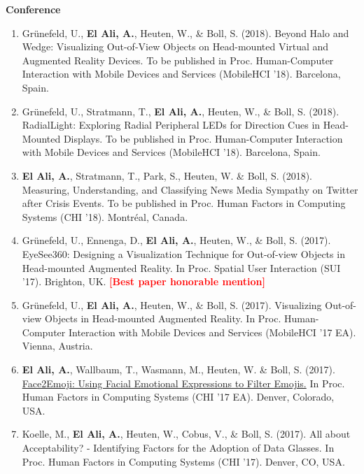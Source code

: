 \documentclass{article}
\begin{document}
\textbf{Conference}

\begin{enumerate}

\item Gr{\"u}nefeld, U., \textbf{El Ali, A.}, Heuten, W., \& Boll, S. (2018). Beyond Halo and Wedge: Visualizing Out-of-View Objects on Head-mounted Virtual and Augmented Reality Devices. To be published in Proc. Human-Computer Interaction with Mobile Devices and Services (MobileHCI '18). Barcelona, Spain. 

\item Gr{\"u}nefeld, U., Stratmann, T., \textbf{El Ali, A.}, Heuten, W., \& Boll, S. (2018). RadialLight: Exploring Radial Peripheral LEDs for Direction Cues in Head-Mounted Displays. To be published in Proc. Human-Computer Interaction with Mobile Devices and Services (MobileHCI '18). Barcelona, Spain. 

\item \textbf{El Ali, A.}, Stratmann, T., Park, S., Heuten, W. \& Boll, S. (2018). Measuring, Understanding, and Classifying News Media Sympathy on Twitter after Crisis Events. To be published in Proc. Human Factors in Computing Systems (CHI '18). Montr\'{e}al, Canada.

\item Gr{\"u}nefeld, U., Ennenga, D., \textbf{El Ali, A.}, Heuten, W., \& Boll, S. (2017). EyeSee360: Designing a Visualization Technique for Out-of-view Objects in Head-mounted Augmented Reality. In Proc. Spatial User Interaction (SUI '17). Brighton, UK. \textcolor{red}{\textbf{[Best paper honorable mention]}}

\item Gr{\"u}nefeld, U., \textbf{El Ali, A.}, Heuten, W., \& Boll, S. (2017). Visualizing Out-of-view Objects in Head-mounted Augmented Reality. In Proc. Human-Computer Interaction with Mobile Devices and Services (MobileHCI '17 EA). Vienna, Austria.

\item \textbf{El Ali, A.}, Wallbaum, T., Wasmann, M., Heuten, W. \& Boll, S. (2017). \href{http://abdoelali.com/pdfs/CHI17_lbw_face2emoji.pdf}{Face2Emoji: Using Facial Emotional Expressions to Filter Emojis.} In Proc. Human Factors in Computing Systems (CHI '17 EA). Denver, Colorado, USA. 

\item Koelle, M., \textbf{El Ali, A.}, Heuten, W., Cobus, V., \& Boll, S. (2017). All about Acceptability? - Identifying Factors for the Adoption of Data Glasses. In Proc. Human Factors in Computing Systems (CHI '17). Denver, CO, USA.


\end{enumerate}
\end{document}
